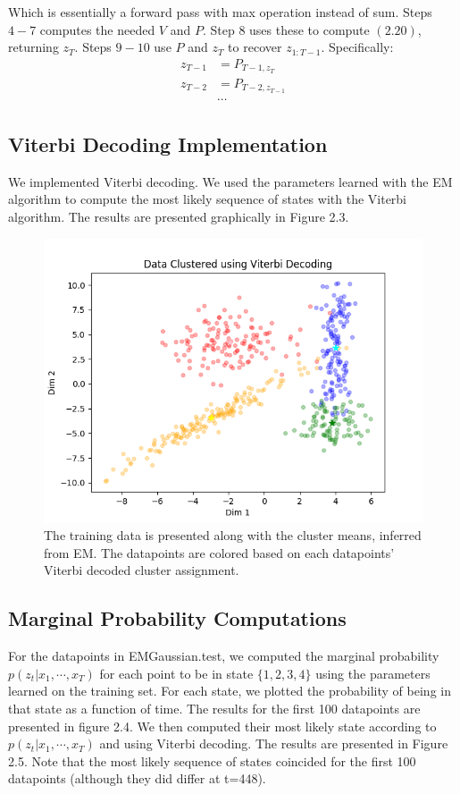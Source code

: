 \documentclass[paper=a4, fontsize=11pt]{scrartcl} %
\numberwithin{equation}{section} %
\numberwithin{figure}{section} %
\numberwithin{table}{section} %
\begin{document}
Which is essentially a forward pass with max operation instead of sum. Steps $4-7$ computes the needed $V$ and $P$. Step $8$ uses these to compute $(2.20)$, returning $z_T$. Steps $9-10$ use $P$ and $z_T$ to recover $z_{1:T-1}$. Specifically:
\begin{align*}
z_{T-1} &= P_{T-1,{z_T}} \\
z_{T-2} &= P_{T-2,{z_{T-1}}} \\
&\cdots
\end{align*}

\subsection{Viterbi Decoding Implementation}

We implemented Viterbi decoding. We used the parameters learned with the EM algorithm to compute the most likely sequence of states with the Viterbi algorithm. The results are presented graphically in Figure 2.3.

\begin{figure}
	\includegraphics[width=.9\linewidth]{Viterbi_Plot.png}
	\caption{The training data is presented along with the cluster means, inferred from EM. The datapoints are colored based on each datapoints' Viterbi decoded cluster assignment.}
\end{figure}

\subsection{Marginal Probability Computations}

For the datapoints in EMGaussian.test, we computed the marginal probability
\(p(z_t|x_1, \cdots , x_T )\) for each point to be in state \(\{1, 2, 3, 4\}\) using the parameters learned on the training set. For each state, we plotted the probability of being in that state as a function of time. The results for the first 100 datapoints are presented in figure 2.4. We then computed their most likely state according to \(p(z_t|x_1, \cdots , x_T )\) and using Viterbi decoding. The results are presented in Figure 2.5. Note that the most likely sequence of states coincided for the first 100 datapoints (although they did differ at t=448).
\end{document}
